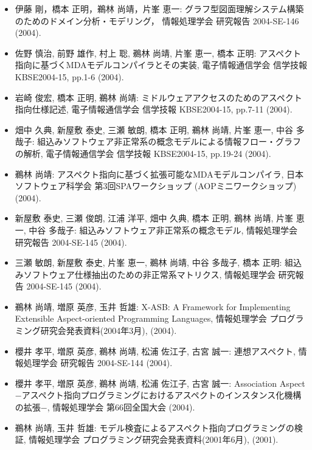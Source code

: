 \documentclass{jarticle}
\begin{document}
\begin{itemize}
\item 伊藤 剛，橋本 正明，鵜林 尚靖，片峯 恵一:
グラフ型図面理解システム構築のためのドメイン分析・モデリング，
情報処理学会 研究報告 2004-SE-146 (2004).

\item 佐野 慎治, 前野 雄作, 村上 聡, 鵜林 尚靖, 片峯 恵一, 橋本 正明:
アスペクト指向に基づくMDAモデルコンパイラとその実装,
電子情報通信学会 信学技報 KBSE2004-15, pp.1-6 (2004).

\item 岩崎 俊宏, 橋本 正明, 鵜林 尚靖:
ミドルウェアアクセスのためのアスペクト指向仕様記述,
電子情報通信学会 信学技報 KBSE2004-15, pp.7-11 (2004).

\item 畑中 久典, 新屋敷 泰史, 三瀬 敏朗, 橋本 正明, 鵜林 尚靖, 片峯 恵一, 中谷 多哉子:
組込みソフトウェア非正常系の概念モデルによる情報フロー・グラフの解析,
電子情報通信学会 信学技報 KBSE2004-15, pp.19-24 (2004).

\item 鵜林 尚靖:
アスペクト指向に基づく拡張可能なMDAモデルコンパイラ,
日本ソフトウェア科学会 第3回SPAワークショップ (AOPミニワークショップ) (2004).

\item 新屋敷 泰史, 三瀬 俊朗, 江浦 洋平, 畑中 久典, 橋本 正明, 鵜林 尚靖, 片峯 恵一, 中谷 多哉子:
組込みソフトウェア非正常系の概念モデル,
情報処理学会 研究報告 2004-SE-145 (2004).

\item 三瀬 敏朗, 新屋敷 泰史, 片峯 恵一, 鵜林 尚靖, 中谷 多哉子, 橋本 正明:
組込みソフトウェア仕様抽出のための非正常系マトリクス,
情報処理学会 研究報告 2004-SE-145 (2004).

\item 鵜林 尚靖, 増原 英彦, 玉井 哲雄:
X-ASB: A Framework for Implementing Extensible Aspect-oriented Programming Languages,
情報処理学会 プログラミング研究会発表資料(2004年3月),
(2004).

\item 櫻井 孝平, 増原 英彦, 鵜林 尚靖, 松浦 佐江子, 古宮 誠一:
連想アスペクト,
情報処理学会 研究報告 2004-SE-144 (2004).

\item 櫻井 孝平, 増原 英彦, 鵜林 尚靖, 松浦 佐江子, 古宮 誠一:
Association Aspect −アスペクト指向プログラミングにおけるアスペクトのインスタンス化機構の拡張−,
情報処理学会 第66回全国大会 (2004).

\item 鵜林 尚靖, 玉井 哲雄:
モデル検査によるアスペクト指向プログラミングの検証,
情報処理学会 プログラミング研究会発表資料(2001年6月),
(2001).


\end{itemize}
\end{document}

